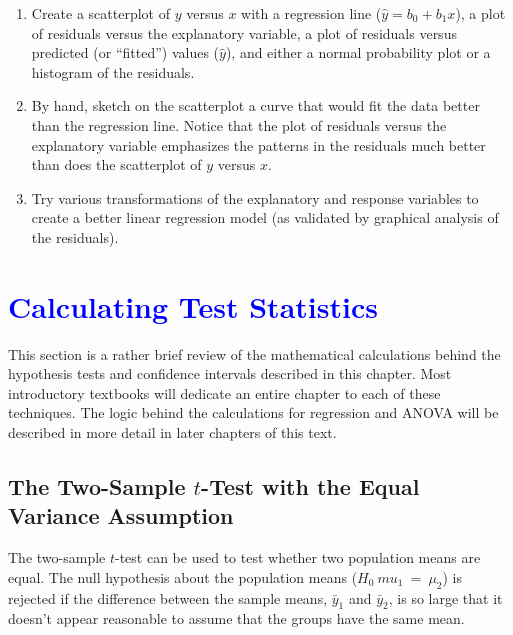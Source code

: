 \documentclass[
]{report}
\begin{document}
\begin{enumerate}
\def\labelenumi{(\alph{enumi})}
\item
  Create a scatterplot of \(\scriptstyle y\) versus \(\scriptstyle x\) with a regression line (\(\scriptstyle \hat{y} = b_0 + b_1 x\)), a plot of residuals versus the explanatory variable, a plot of residuals versus predicted (or ``fitted'') values (\(\scriptstyle \hat{y}\)), and either a normal probability plot or a histogram of the residuals.
\item
  By hand, sketch on the scatterplot a curve that would fit the data better than the regression line. Notice that the plot of residuals versus the explanatory variable emphasizes the patterns in the residuals much better than does the scatterplot of \(\scriptstyle y\) versus \(\scriptstyle x\).
\item
  Try various transformations of the explanatory and response variables to create a better linear regression model (as validated by graphical analysis of the residuals).
\end{enumerate}

\hypertarget{section-23}{%
\section{\texorpdfstring{\textcolor{blue}{ Calculating Test Statistics}}{}}\label{section-23}}

This section is a rather brief review of the mathematical calculations behind the hypothesis tests and confidence intervals described in this chapter. Most introductory textbooks will dedicate an entire chapter to each of these techniques. The logic behind the calculations for regression and ANOVA will be described in more detail in later chapters of this text.

\hypertarget{the-two-sample-scriptstyle-t-test-with-the-equal-variance-assumption}{%
\subsection*{\texorpdfstring{The Two-Sample \(\scriptstyle t\)-Test with the Equal Variance Assumption}{The Two-Sample \textbackslash scriptstyle t-Test with the Equal Variance Assumption}}\label{the-two-sample-scriptstyle-t-test-with-the-equal-variance-assumption}}

The two-sample \(\scriptstyle t\)-test can be used to test whether two population means are equal. The null hypothesis about the population means (\(\scriptstyle H_0\ mu_1 \ =\  \mu_2\)) is rejected if the difference between the sample means, \(\scriptstyle \bar{y}_1\) and \(\scriptstyle \bar{y}_2\), is so large that it doesn't appear reasonable to assume that the groups have the same mean.
\end{document}
